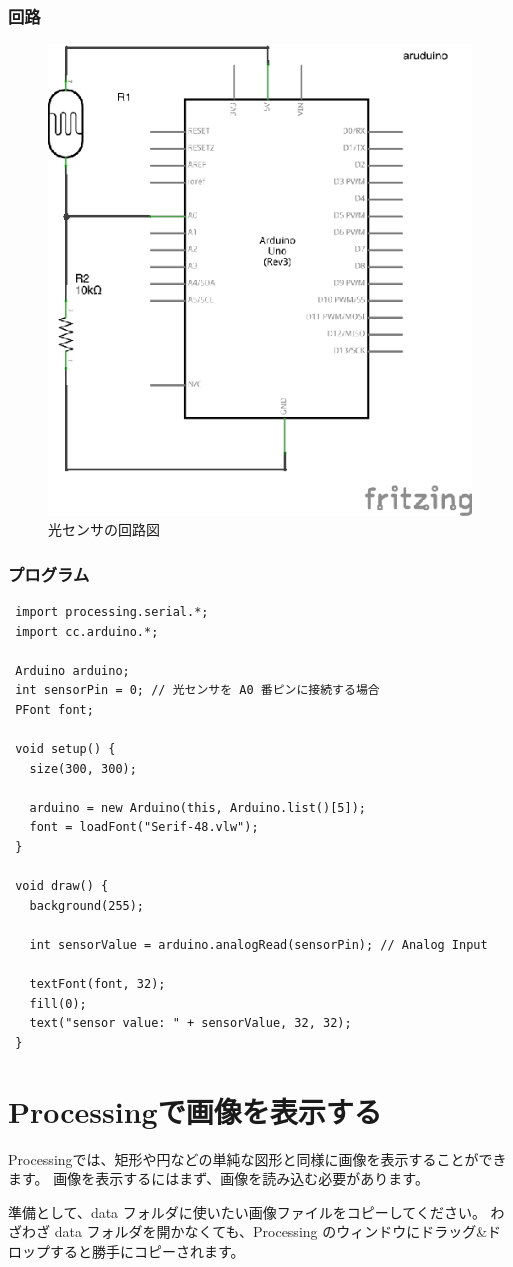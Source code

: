 \documentclass[11pt,a4paper]{jarticle}
\begin{document}
\subsubsection*{回路}
\begin{figure}[htbp]
 \centering
 \includegraphics[width=0.4\columnwidth]{img/light_sensor_circuit.eps}
 \caption{光センサの回路図}
\end{figure}

\newpage

\subsubsection*{プログラム}
\begin{lstlisting}
 import processing.serial.*;
 import cc.arduino.*;
 
 Arduino arduino;
 int sensorPin = 0; // 光センサを A0 番ピンに接続する場合
 PFont font;
 
 void setup() {
   size(300, 300);

   arduino = new Arduino(this, Arduino.list()[5]);
   font = loadFont("Serif-48.vlw");
 }

 void draw() {
   background(255);

   int sensorValue = arduino.analogRead(sensorPin); // Analog Input

   textFont(font, 32);
   fill(0);
   text("sensor value: " + sensorValue, 32, 32);
 }
\end{lstlisting}

\section{Processingで画像を表示する}
Processingでは、矩形や円などの単純な図形と同様に画像を表示することができます。
画像を表示するにはまず、画像を読み込む必要があります。

準備として、data フォルダに使いたい画像ファイルをコピーしてください。
わざわざ data フォルダを開かなくても、Processing のウィンドウにドラッグ\&ドロップすると勝手にコピーされます。
\end{document}
